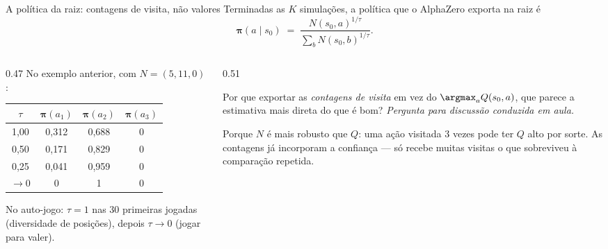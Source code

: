 \documentclass[aspectratio=169, 10pt]{beamer}
\newcommand{\paradiscussao}{\smallskip
  {\footnotesize\color{rlCinza}\itshape Pergunta para discussão conduzida em aula.}}
\newcommand{\Nvis}{N}
\newcommand{\raizpol}{\bm{\pi}}
\begin{document}
\begin{frame}{A política da raiz: contagens de visita, não valores}
  \footnotesize
  Terminadas as $K$ simulações, a política que o AlphaZero exporta na raiz é
  \[
    \raizpol(a \mid s_0) \;=\; \frac{\Nvis(s_0,a)^{1/\tau}}{\sum_b \Nvis(s_0,b)^{1/\tau}} .
  \]

  \begin{columns}[T]
    \begin{column}{0.47\textwidth}
      No exemplo anterior, com $\Nvis = (5,11,0)$:
      \medskip
      \begin{center}\small
      \begin{tabular}{cccc}
        \toprule
        $\tau$ & $\raizpol(a_1)$ & $\raizpol(a_2)$ & $\raizpol(a_3)$ \\
        \midrule
        1,00 & 0,312 & 0,688 & 0 \\
        0,50 & 0,171 & 0,829 & 0 \\
        0,25 & 0,041 & 0,959 & 0 \\
        $\to 0$ & 0 & 1 & 0 \\
        \bottomrule
      \end{tabular}
      \end{center}
      \medskip
      No auto-jogo: $\tau = 1$ nas 30 primeiras jogadas (diversidade de
      posições), depois $\tau \to 0$ (jogar para valer).
    \end{column}
    \begin{column}{0.51\textwidth}
      \begin{quizbox}{}
        Por que exportar as \emph{contagens de visita} em vez do
        $\argmax_a Q(s_0,a)$, que parece a estimativa mais direta do que é bom?
        \paradiscussao
      \end{quizbox}
      \pause
      \begin{respbox}
        Porque $\Nvis$ é mais robusto que $Q$: uma ação visitada 3 vezes pode ter
        $Q$ alto por sorte. As contagens já incorporam a confiança — só recebe
        muitas visitas o que sobreviveu à comparação repetida.
      \end{respbox}
    \end{column}
  \end{columns}
\end{frame}
\end{document}
